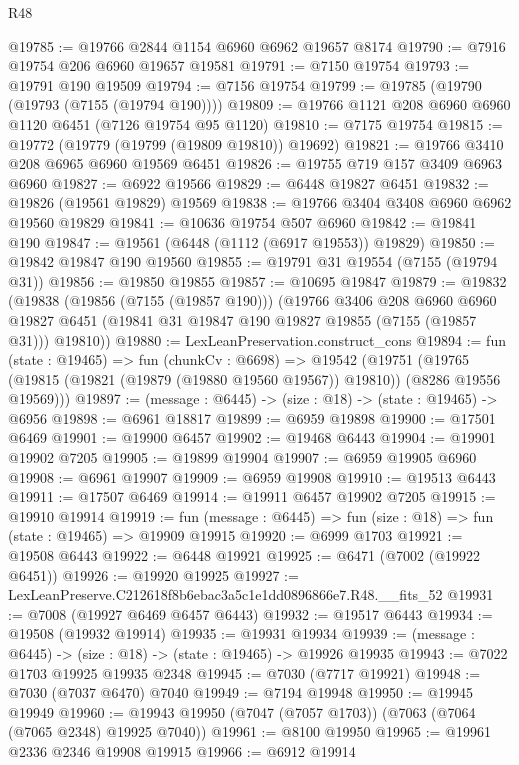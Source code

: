 \begin{lexlean}{R48}
\begin{coremodule}
@19785 := @19766 @2844 @1154 @6960 @6962 @19657 @8174
@19790 := @7916 @19754 @206 @6960 @19657 @19581
@19791 := @7150 @19754
@19793 := @19791 @190 @19509
@19794 := @7156 @19754
@19799 := @19785 (@19790 (@19793 (@7155 (@19794 @190))))
@19809 := @19766 @1121 @208 @6960 @6960 @1120 @6451 (@7126 @19754 @95 @1120)
@19810 := @7175 @19754
@19815 := @19772 (@19779 (@19799 (@19809 @19810)) @19692)
@19821 := @19766 @3410 @208 @6965 @6960 @19569 @6451
@19826 := @19755 @719 @157 @3409 @6963 @6960
@19827 := @6922 @19566
@19829 := @6448 @19827 @6451
@19832 := @19826 (@19561 @19829) @19569
@19838 := @19766 @3404 @3408 @6960 @6962 @19560 @19829
@19841 := @10636 @19754 @507 @6960
@19842 := @19841 @190
@19847 := @19561 (@6448 (@1112 (@6917 @19553)) @19829)
@19850 := @19842 @19847 @190 @19560
@19855 := @19791 @31 @19554 (@7155 (@19794 @31))
@19856 := @19850 @19855
@19857 := @10695 @19847
@19879 := @19832
    (@19838
      (@19856 (@7155 (@19857 @190)))
      (@19766
        @3406
        @208
        @6960
        @6960
        @19827
        @6451
        (@19841 @31 @19847 @190 @19827 @19855 (@7155 (@19857 @31)))
        @19810))
@19880 := LexLeanPreservation.construct_cons
@19894 := fun (state : @19465) =>
  fun (chunkCv : @6698) =>
  @19542
    (@19751 (@19765 (@19815 (@19821 (@19879 (@19880 @19560 @19567)) @19810)) (@8286 @19556 @19569)))
@19897 := (message : @6445) -> (size : @18) -> (state : @19465) -> @6956
@19898 := @6961 @18817
@19899 := @6959 @19898
@19900 := @17501 @6469
@19901 := @19900 @6457
@19902 := @19468 @6443
@19904 := @19901 @19902 @7205
@19905 := @19899 @19904
@19907 := @6959 @19905 @6960
@19908 := @6961 @19907
@19909 := @6959 @19908
@19910 := @19513 @6443
@19911 := @17507 @6469
@19914 := @19911 @6457 @19902 @7205
@19915 := @19910 @19914
@19919 := fun (message : @6445) => fun (size : @18) => fun (state : @19465) => @19909 @19915
@19920 := @6999 @1703
@19921 := @19508 @6443
@19922 := @6448 @19921
@19925 := @6471 (@7002 (@19922 @6451))
@19926 := @19920 @19925
@19927 := LexLeanPreserve.C212618f8b6ebac3a5c1e1dd0896866e7.R48.__fits_52
@19931 := @7008 (@19927 @6469 @6457 @6443)
@19932 := @19517 @6443
@19934 := @19508 (@19932 @19914)
@19935 := @19931 @19934
@19939 := (message : @6445) -> (size : @18) -> (state : @19465) -> @19926 @19935
@19943 := @7022 @1703 @19925 @19935 @2348
@19945 := @7030 (@7717 @19921)
@19948 := @7030 (@7037 @6470) @7040
@19949 := @7194 @19948
@19950 := @19945 @19949
@19960 := @19943 @19950 (@7047 (@7057 @1703)) (@7063 (@7064 (@7065 @2348) @19925 @7040))
@19961 := @8100 @19950
@19965 := @19961 @2336 @2346 @19908 @19915
@19966 := @6912 @19914

\end{coremodule}
\end{lexlean}

